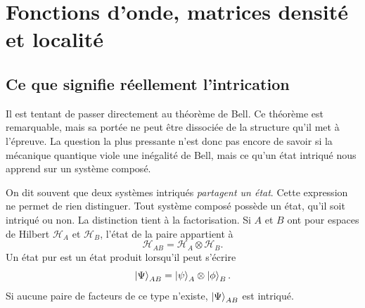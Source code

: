 \chapter{Fonctions d’onde, matrices densité et localité}


\section{Ce que signifie réellement l’intrication}

Il est tentant de passer directement au théorème de Bell. Ce théorème est remarquable, mais sa portée ne peut être dissociée de la structure qu’il met à l’épreuve. La question la plus pressante n’est donc pas encore de savoir si la mécanique quantique viole une inégalité de Bell, mais ce qu’un état intriqué nous apprend sur un système composé.

On dit souvent que deux systèmes intriqués \emph{partagent un état}. Cette expression ne permet de rien distinguer. Tout système composé possède un état, qu’il soit intriqué ou non. La distinction tient à la factorisation. Si \(A\) et \(B\) ont pour espaces de Hilbert \(\mathcal H_A\) et \(\mathcal H_B\), l’état de la paire appartient à
\begin{equation}
\mathcal H_{AB}=\mathcal H_A\otimes\mathcal H_B.
\end{equation}
Un état pur est un état produit lorsqu’il peut s’écrire
\begin{equation}
\left\lvert\Psi\right\rangle_{AB}=\left\lvert\psi\right\rangle_A\otimes\left\lvert\phi\right\rangle_B.
\label{eq:l7-product-state}
\end{equation}
Si aucune paire de facteurs de ce type n’existe, \(\left\lvert\Psi\right\rangle_{AB}\) est intriqué.

